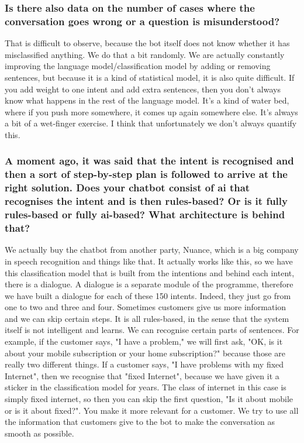 \begin{appendices}
	\subsubsection{Is there also data on the number of cases where the conversation goes wrong or a question is misunderstood?}
	That is difficult to observe, because the bot itself does not know whether it has misclassified anything. We do that a bit randomly. We are actually constantly improving the language model/classification model by adding or removing sentences, but because it is a kind of statistical model, it is also quite difficult. If you add weight to one intent and add extra sentences, then you don't always know what happens in the rest of the language model. It's a kind of water bed, where if you push more somewhere, it comes up again somewhere else. It's always a bit of a wet-finger exercise. I think that unfortunately we don't always quantify this. 
	
	\subsubsection{A moment ago, it was said that the intent is recognised and then a sort of step-by-step plan is followed to arrive at the right solution. Does your chatbot consist of \acrshort{ai} that recognises the intent and is then rules-based? Or is it fully rules-based or fully \acrshort{ai}-based? What architecture is behind that?}
	We actually buy the chatbot from another party, Nuance, which is a big company in speech recognition and things like that. It actually works like this, so we have this classification model that is built from the intentions and behind each intent, there is a dialogue. A dialogue is a separate module of the programme, therefore we have built a dialogue for each of these 150 intents. Indeed, they just go from one to two and three and four. Sometimes customers give us more information and we can skip certain steps. It is all rules-based, in the sense that the system itself is not intelligent and learns. We can recognise certain parts of sentences. For example, if the customer says, "I have a problem," we will first ask, "OK, is it about your mobile subscription or your home subscription?" because those are really two different things. If a customer says, "I have problems with my fixed Internet", then we recognise that "fixed Internet", because we have given it a sticker in the classification model for years.  The class of internet in this case is simply fixed internet, so then you can skip the first question, "Is it about mobile or is it about fixed?". You make it more relevant for a customer. We try to use all the information that customers give to the bot to make the conversation as smooth as possible.
	

\end{appendices}
